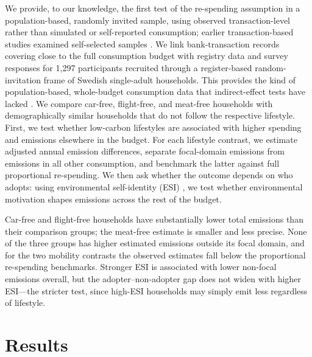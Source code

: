 \documentclass[sn-nature]{sn-jnl}
\begin{document}
We provide, to our knowledge, the first test of the re-spending assumption in a population-based, randomly invited sample, using observed transaction-level rather than simulated or self-reported consumption; earlier transaction-based studies examined self-selected samples \citep{AnderssonNassen2023}. We link bank-transaction records covering close to the full consumption budget \citep{AnderssonNassen2023,trendl2023} with registry data and survey responses for 1{,}297 participants recruited through a register-based random-invitation frame of Swedish single-adult households. This provides the kind of population-based, whole-budget consumption data that indirect-effect tests have lacked \citep{exadaktylos2021energy}. We compare car-free, flight-free, and meat-free households with demographically similar households that do not follow the respective lifestyle. First, we test whether low-carbon lifestyles are associated with higher spending and emissions elsewhere in the budget. For each lifestyle contrast, we estimate adjusted annual emission differences, separate focal-domain emissions from emissions in all other consumption, and benchmark the latter against full proportional re-spending. We then ask whether the outcome depends on who adopts: using environmental self-identity (ESI) \citep{VanDerWerff2013}, we test whether environmental motivation shapes emissions across the rest of the budget.

Car-free and flight-free households have substantially lower total emissions than their comparison groups; the meat-free estimate is smaller and less precise. None of the three groups has higher estimated emissions outside its focal domain, and for the two mobility contrasts the observed estimates fall below the proportional re-spending benchmarks. Stronger ESI is associated with lower non-focal emissions overall, but the adopter--non-adopter gap does not widen with higher ESI---the stricter test, since high-ESI households may simply emit less regardless of lifestyle.

\section{Results}
\end{document}

